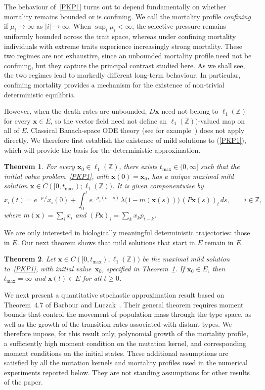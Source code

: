 \documentclass[12pt]{article}
\newtheorem{theorem}{Theorem}
\newcommand{\Z}{\ensuremath{\mathbb Z}}
\newcommand{\BS}{\ensuremath{\ell_1(\Z)}}
\newcommand{\bx}{\boldsymbol{x}}
\begin{document}
The behaviour of~\eqref{PKP1} turns out to depend fundamentally on
whether mortality remains bounded or is confining. We call the mortality
profile \emph{confining} if $\mu_i\to\infty$ as $|i|\to\infty$. When
$\sup_i\mu_i<\infty$, the selective pressure remains uniformly bounded
across the trait space, whereas under confining mortality individuals
with extreme traits experience increasingly strong mortality. 
These two regimes are not exhaustive, since an unbounded mortality profile 
need not be confining, but they capture the principal contrast studied here.
As we shall see, the two regimes lead to markedly different long-term
behaviour. In particular, confining mortality provides a mechanism for
the existence of non-trivial deterministic equilibria. 

However, when the death rates are unbounded, $D\bx$ need not belong to
$\BS$ for every $\bx\in E$, so the vector field need not define an
$\BS)$-valued map on all of $E$. Classical Banach-space ODE theory (see
for example~\cite{Fat99}) does not apply directly. We therefore first
establish the existence of mild solutions to (\ref{PKP1}), which will
provide the basis for the deterministic approximation.

\begin{theorem}\label{Thm:mildsolution}
For every $\bx_0\in\BS$, there exists
$t_{\max}\in(0,\infty]$ such that the initial value problem~\eqref{PKP1},
with $\bx(0)=\bx_0$, has a unique maximal mild solution $\bx\in
C([0,t_{\max});\BS)$. 
It is given componentwise by 
\begin{equation}
x_i(t)=e^{-\mu_i t}x_i(0)+\int_0^t
e^{-\mu_i(t-s)}\,\lambda\bigl(1-m(\bx(s))\bigr)\, (P\bx(s))_i\,ds,
\qquad i\in \Z,
\label{mildsolution}
\end{equation}
where $m(\bx)=\sum_i x_i$ and $(P\bx)_i = \sum_{k} x_k p_{i-k}$.
\end{theorem}


We are only interested in biologically meaningful deterministic
trajectories: those in $E$. Our next theorem shows that mild solutions
that start in $E$ remain in $E$.

\begin{theorem}
\label{staysinE}
Let $\bx\in C([0,t_{\max});\BS)$ be the maximal mild solution
to~\eqref{PKP1}, with initial value~$\bx_0$, specified in
Theorem~\ref{Thm:mildsolution}. If $\bx_0\in E$, then $t_{\max}=\infty$
and $\bx(t)\in E$ for all $t\geq0$.
\end{theorem}

\medskip
\noindent
We next present a quantitative stochastic approximation result based on
Theorem~4.7 of Barbour and Luczak~\cite{BL12b}. Their general theorem
requires moment bounds that control the movement of population mass
through the type space, as well as the growth of the transition rates
associated with distant types. We therefore impose, for this result
only, polynomial growth of the mortality profile, a sufficiently high
moment condition on the mutation kernel, and corresponding moment
conditions on the initial states. These additional assumptions are
satisfied by all the mutation kernels and mortality profiles used in the
numerical experiments reported below. They are not standing assumptions
for other results of the paper.
\end{document}
